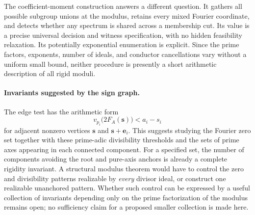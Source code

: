 \documentclass[11pt]{article}
\numberwithin{equation}{section}
\theoremstyle{definition}
\theoremstyle{remark}
\begin{document}
The coefficient-moment construction answers a different question. It gathers all possible subgroup unions at the modulus, retains every mixed Fourier coordinate, and detects whether any spectrum is shared across a membership cut. Its value is a precise universal decision and witness specification, with no hidden feasibility relaxation. Its potentially exponential enumeration is explicit. Since the prime factors, exponents, number of ideals, and conductor cancellations vary without a uniform small bound, neither procedure is presently a short arithmetic description of all rigid moduli.

\paragraph{Invariants suggested by the sign graph.}
The edge test has the arithmetic form
\[
 v_{p_i}\!\bigl(2F_A(\boldsymbol s)\bigr)<a_i-s_i
\]
for adjacent nonzero vertices $\boldsymbol s$ and
$\boldsymbol s+\boldsymbol e_i$. This suggests studying the Fourier zero
set together with these prime-adic divisibility thresholds and the sets
of prime axes appearing in each connected component. For a specified
set, the number of components avoiding the root and pure-axis anchors is
already a complete rigidity invariant. A structural modulus theorem
would have to control the zero and divisibility patterns realizable by
\emph{every} divisor ideal, or construct one realizable unanchored
pattern. Whether such control can be expressed by a useful collection
of invariants depending only on the prime factorization of the modulus
remains open; no sufficiency claim for a proposed smaller collection is
made here.
\end{document}
